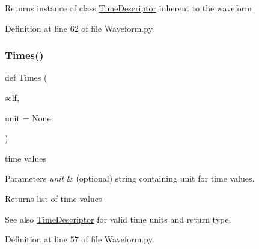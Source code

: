 \begin{DoxyReturn}{Returns}
instance of class \hyperlink{namespaceSignalIntegrity_1_1TimeDomain_1_1Waveform_1_1TimeDescriptor}{Time\+Descriptor} inherent to the waveform 
\end{DoxyReturn}


Definition at line 62 of file Waveform.\+py.

\mbox{\label{classSignalIntegrity_1_1TimeDomain_1_1Waveform_1_1Waveform_1_1Waveform_a5ba53f81d111ea013ebb7f55ed99d959}} 
\subsubsection{\texorpdfstring{Times()}{Times()}}
{\footnotesize\ttfamily def Times (\begin{DoxyParamCaption}\item[{}]{self,  }\item[{}]{unit = {\ttfamily None} }\end{DoxyParamCaption})}



time values 


\begin{DoxyParams}{Parameters}
{\em unit} & (optional) string containing unit for time values. \\
\hline
\end{DoxyParams}
\begin{DoxyReturn}{Returns}
list of time values 
\end{DoxyReturn}
\begin{DoxySeeAlso}{See also}
\hyperlink{namespaceSignalIntegrity_1_1TimeDomain_1_1Waveform_1_1TimeDescriptor}{Time\+Descriptor} for valid time units and return type. 
\end{DoxySeeAlso}


Definition at line 57 of file Waveform.\+py.

\mbox{\label{classSignalIntegrity_1_1TimeDomain_1_1Waveform_1_1Waveform_1_1Waveform_a3dc7b1e5eba8fb649156094dfdf7a893}} 
